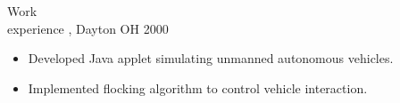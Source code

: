 \begin{category}{Work \\experience}
, Dayton OH  2000 
\begin{itemize}
\item Developed Java applet simulating unmanned autonomous vehicles.
\item Implemented flocking algorithm to control vehicle interaction.
\end{itemize}



\end{category}
